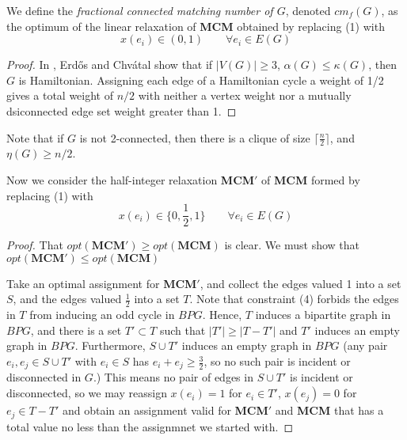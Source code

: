 We define the \textit{fractional connected matching number of $G$}, denoted $cm_f(G)$, as the optimum of the linear relaxation of \textbf{MCM} obtained by replacing (1) with
\begin{equation*}\tag{$1'$}x(e_i) \in (0,1) \qquad \forall e_i \in E(G)\end{equation*}

\begin{proof}
	In \cite{MR0297600}, Erd\H{o}s and Chv{\'a}tal show that if $|V(G)| \geq 3$, $\alpha(G) \leq \kappa(G)$, then $G$ is Hamiltonian.  Assigning each edge of a Hamiltonian cycle a weight of 1/2 gives a total weight of $n/2$ with neither a vertex weight nor a mutually dsiconnected edge set weight greater than 1.
\end{proof}

Note that if $G$ is not 2-connected, then there is a clique of size $\lceil \frac{n}{2} \rceil$, and $\eta(G) \geq n/2$.

Now we consider the half-integer relaxation \textbf{MCM$'$} of \textbf{MCM} formed by replacing (1) with
\begin{equation*}\tag{$1'$}x(e_i) \in \{0, \frac{1}{2}, 1\} \qquad \forall e_i \in E(G)\end{equation*}
\begin{proof}
	That $opt(\textbf{MCM$'$}) \geq opt(\textbf{MCM})$ is clear.  We must show that $opt(\textbf{MCM$'$}) \leq opt(\textbf{MCM})$

	Take an optimal assignment for \textbf{MCM$'$}, and collect the edges valued 1 into a set $S$, and the edges valued $\frac{1}{2}$ into a set $T$.  Note that constraint (4) forbids the edges in $T$ from inducing an odd cycle in $BPG$.  Hence, $T$ induces a bipartite graph in $BPG$, and there is a set $T'\subset T$ such that $|T'| \geq |T-T'|$ and $T'$ induces an empty graph in $BPG$.  Furthermore, $S \cup T'$ induces an empty graph in $BPG$ (any pair $e_i, e_j \in S\cup T'$ with $e_i \in S$ has $e_i + e_j \geq \frac{3}{2}$, so no such pair is incident or disconnected in $G$.)  This means no pair of edges in $S\cup T'$ is incident or disconnected, so we may reassign $x(e_i) = 1$ for $e_i \in T'$, $x(e_j) = 0$ for $e_j \in T-T'$ and obtain an assignment valid for \textbf{MCM$'$} and \textbf{MCM} that has a total value no less than the assignmnet we started with.
\end{proof}
%
